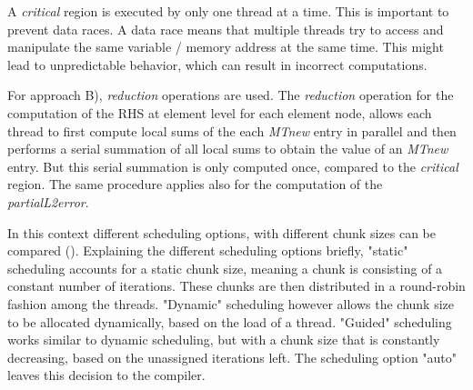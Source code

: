 A \textit{critical} region is executed by only one thread at a time. This is important to prevent data races. A data race means that multiple threads try to access and manipulate the same variable / memory address at the same time. This might lead to unpredictable behavior, which can result in incorrect computations. 

For approach B), \textit{reduction} operations are used. The \textit{reduction} operation for the computation of the RHS at element level for each element node, allows each thread to first compute local sums of the each \textit{MTnew} entry in parallel and then performs a serial summation of all local sums to obtain the value of an \textit{MTnew} entry. But this serial summation is only computed once, compared to the \textit{critical} region. The same procedure applies also for the computation of the \textit{partialL2error}. 

In this context different scheduling options, with different chunk sizes can be compared (). Explaining the different scheduling options briefly, "static" scheduling accounts for a static chunk size, meaning a chunk is consisting of a constant number of iterations. These chunks are then distributed in a round-robin fashion among the threads. "Dynamic" scheduling however allows the chunk size to be allocated dynamically, based on the load of a thread. "Guided" scheduling works similar to dynamic scheduling, but with a chunk size that is constantly decreasing, based on the unassigned iterations left. The scheduling option "auto" leaves this decision to the compiler.
\newpage

